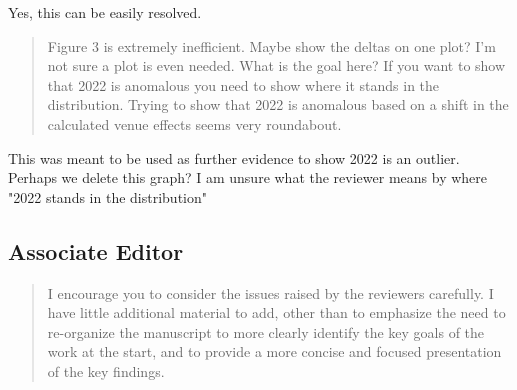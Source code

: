\documentclass[12pt]{article}
\newenvironment{comment}%
{\begin{quotation}\noindent\small\it\color{darkblue}\ignorespaces%
}{\end{quotation}}
\begin{document}
Yes, this can be easily resolved.

\begin{comment}
Figure 3 is extremely inefficient. Maybe show the deltas on one plot? I'm not
sure a plot is even needed. What is the goal here? If you want to show that 2022
is anomalous you need to show where it stands in the distribution. Trying to
show that 2022 is anomalous based on a shift in the calculated venue effects
seems very roundabout.
\end{comment}

This was meant to be used as further evidence to show 2022 is an outlier. Perhaps
we delete this graph? I am unsure what the reviewer means by where "2022 stands
in the distribution"


\subsection*{Associate Editor}
\begin{comment}
I encourage you to consider the issues raised by the reviewers carefully. I have
little additional material to add, other than to emphasize the need to
re-organize the manuscript to more clearly identify the key goals of the work at
the start, and to provide a more concise and focused presentation of the key
findings.
\end{comment}

%
%
\end{document}
